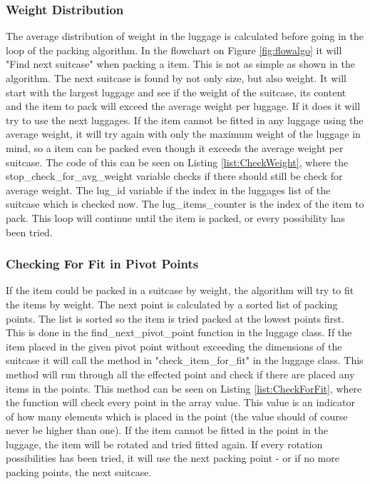 \subsubsection{Weight Distribution}
The average distribution of weight in the luggage is calculated before going in the loop of the packing algorithm. In the flowchart on Figure \ref{fig:flowalgo} it will "Find next suitcase" when packing a item. This is not as simple as shown in the algorithm. The next suitcase is found by not only size, but also weight. It will start with the largest luggage and see if the weight of the suitcase, its content and the item to pack will exceed the average weight per luggage. If it does it will try to use the next luggages. If the item cannot be fitted in any luggage using the average weight, it will try again with only the maximum weight of the luggage in mind, so a item can be packed even though it exceeds the average weight per suitcase. The code of this can be seen on Listing \ref{list:CheckWeight}, where the stop\_check\_for\_avg\_weight variable checks if there should still be check for average weight. The lug\_id variable if the index in the luggages list of the suitcase which is checked now. The lug\_items\_counter is the index of the item to pack. This loop will continue until the item is packed, or every possibility has been tried.
\subsubsection{Checking For Fit in Pivot Points}
If the item could be packed in a suitcase by weight, the algorithm will try to fit the items by weight. The next point is calculated by a sorted list of packing points. The list is sorted so the item is tried packed at the lowest points first. This is done in the find\_next\_pivot\_point function in the luggage class. If the item placed in the given pivot point without exceeding the dimensions of the suitcase it will call the method in "check\_item\_for\_fit" in the luggage class. This method will run through all the effected point and check if there are placed any items in the points. This method can be seen on Listing \ref{list:CheckForFit}, where the function will check every point in the array value. This value is an indicator of how many elements which is placed in the point (the value should of course never be higher than one).
If the item cannot be fitted in the point in the luggage, the item will be rotated and tried fitted again. If every rotation possibilities has been tried, it will use the next packing point - or if no more packing points, the next suitcase.
